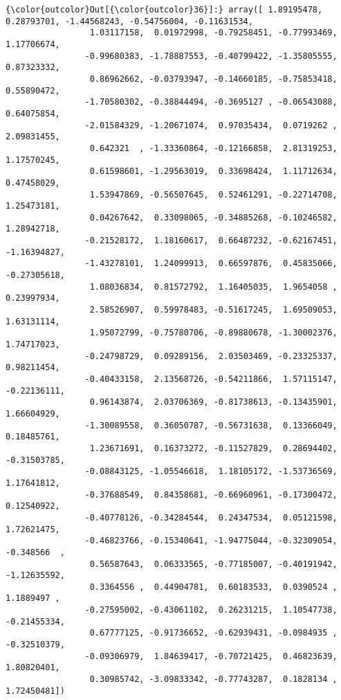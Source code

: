 \documentclass[11pt]{article}
\begin{document}
\begin{Verbatim}[commandchars=\\\{\}]
{\color{outcolor}Out[{\color{outcolor}36}]:} array([ 1.89195478,  0.28793701, -1.44568243, -0.54756004, -0.11631534,
                 1.03117158,  0.01972998, -0.79258451, -0.77993469,  1.17706674,
                -0.99680383, -1.78887553, -0.40799422, -1.35805555,  0.87323332,
                 0.86962662, -0.03793947, -0.14660185, -0.75853418,  0.55890472,
                -1.70580302, -0.38844494, -0.3695127 , -0.06543088,  0.64075854,
                -2.01584329, -1.20671074,  0.97035434,  0.0719262 ,  2.09831455,
                 0.642321  , -1.33360864, -0.12166858,  2.81319253,  1.17570245,
                 0.61598601, -1.29563019,  0.33698424,  1.11712634,  0.47458029,
                 1.53947869, -0.56507645,  0.52461291, -0.22714708,  1.25473181,
                 0.04267642,  0.33098065, -0.34885268, -0.10246582,  1.28942718,
                -0.21528172,  1.18160617,  0.66487232, -0.62167451, -1.16394827,
                -1.43278101,  1.24099913,  0.66597876,  0.45835066, -0.27305618,
                 1.08036834,  0.81572792,  1.16405035,  1.9654058 ,  0.23997934,
                 2.58526907,  0.59978483, -0.51617245,  1.69509053,  1.63131114,
                 1.95072799, -0.75780706, -0.89880678, -1.30002376,  1.74717023,
                -0.24798729,  0.09289156,  2.03503469, -0.23325337,  0.98211454,
                -0.40433158,  2.13568726, -0.54211866,  1.57115147, -0.22136111,
                 0.96143874,  2.03706369, -0.81738613, -0.13435901,  1.66604929,
                -1.30089558,  0.36050787, -0.56731638,  0.13366049,  0.18485761,
                 1.23671691,  0.16373272, -0.11527829,  0.28694402, -0.31503785,
                -0.08843125, -1.05546618,  1.18105172, -1.53736569,  1.17641812,
                -0.37688549,  0.84358681, -0.66960961, -0.17300472,  0.12540922,
                -0.40778126, -0.34284544,  0.24347534,  0.05121598,  1.72621475,
                -0.46823766, -0.15340641, -1.94775044, -0.32309054, -0.348566  ,
                 0.56587643,  0.06333565, -0.77185007, -0.40191942, -1.12635592,
                 0.3364556 ,  0.44904781,  0.60183533,  0.0390524 ,  1.1889497 ,
                -0.27595002, -0.43061102,  0.26231215,  1.10547738, -0.21455334,
                 0.67777125, -0.91736652, -0.62939431, -0.0984935 , -0.32510379,
                -0.09306979,  1.84639417, -0.70721425,  0.46823639,  1.80820401,
                 0.30985742, -3.09833342, -0.77743287,  0.1828134 ,  1.72450481])
\end{Verbatim}
            
\end{document}
